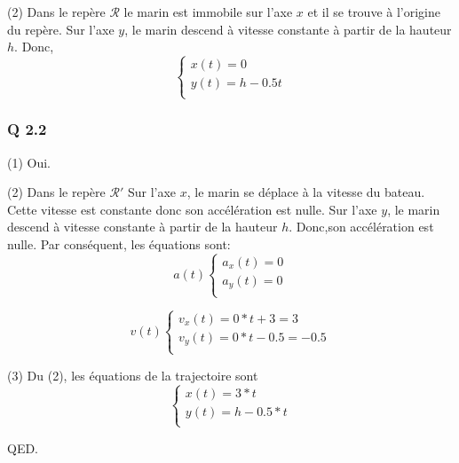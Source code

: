 \documentclass[]{book}
\theoremstyle{definition}
\begin{document}
(2) Dans le rep\`ere $\mathcal{R}$ le marin est immobile sur l'axe $x$ et il se trouve \`a l'origine du rep\`ere.
Sur l'axe $y$, le marin descend \`a vitesse constante \`a partir de la hauteur $h$. Donc, 
$$ 
\left\{ 
\begin{array}{l}
x(t) = 0 \\
y(t) = h -0.5t \\
\end{array}
\right. 
$$

\subsubsection*{Q 2.2}
(1) Oui.

(2) Dans le rep\`ere $\mathcal{R'}$ Sur l'axe $x$, le marin se d\'eplace \`a la vitesse du bateau. Cette vitesse est 
constante donc son acc\'el\'eration est nulle.
Sur l'axe $y$, le marin descend \`a vitesse constante \`a partir de la hauteur $h$. Donc,son acc\'el\'eration est nulle.  
Par cons\'equent, les \'equations sont:
$$ a(t)
\left\{ 
\begin{array}{l}
a_x(t) = 0 \\
a_y(t) = 0 \\
\end{array}
\right. 
$$

$$ v(t)
\left\{ 
\begin{array}{l}
v_x(t) = 0*t + 3 = 3 \\
v_y(t) = 0*t - 0.5 = -0.5 \\
\end{array}
\right. 
$$


(3) Du (2), les \'equations de la trajectoire sont
$$
\left\{ 
\begin{array}{l}
x(t) = 3*t \\
y(t) = h - 0.5*t \\
\end{array}
\right. 
$$




QED.
\end{document}
